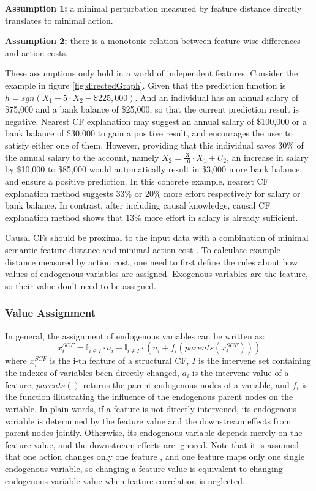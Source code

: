 \noindent \textbf{Assumption 1:} a minimal perturbation measured by feature distance directly translates to minimal action.

\noindent \textbf{Assumption 2:} there is a monotonic relation between feature-wise differences and action costs.

These assumptions only hold in a world of independent features. Consider the example in figure \ref{fig:directedGraph}. Given that the prediction function is $h=sgn(X_1+5\cdot X_2-\$225,000)$. And an individual has an annual salary of \$75,000 and a bank balance of \$25,000, so that the current prediction result is negative. Nearest CF explanation may suggest an annual salary of \$100,000 or a bank balance of \$30,000 to gain a positive result, and encourages the user to satisfy either one of them. However, providing that this individual saves 30\% of the annual salary to the account, namely $X_2=\frac{3}{10}\cdot X_1+U_2$, an increase in salary by \$10,000 to \$85,000 would automatically result in \$3,000 more bank balance, and ensure a positive prediction. In this concrete example, nearest CF explanation method suggests 33\% or 20\% more effort respectively for salary or bank balance. In contrast, after including causal knowledge, causal CF explanation method shows that 13\% more effort in salary is already sufficient.  

Causal CFs should be proximal to the input data with a combination of minimal semantic feature distance and minimal action cost \cite{algorithmicrecourse,preservingCausal}. To calculate example distance measured by action cost, one need to first define the rules about how values of endogenous variables are assigned. Exogenous variables are the feature, so their value don't need to be assigned.
\subsubsection{Value Assignment} In general, the assignment of endogenous variables can be written as:
\begin{equation}\label{eq:SCM}
  x_i^{SCF}=\mathbb{I}_{i\in I}\cdot a_i+\mathbb{I}_{i\notin I}\cdot(u_i+f_i(parents(x_i^{SCF})))
\end{equation}
where $x_i^{SCF}$ is the i-th feature of a structural CF, $I$ is the intervene set containing the indexes of variables been directly changed, $a_i$ is the intervene value of a feature, $parents()$ returns the parent endogenous nodes of a variable, and $f_i$ is the function illustrating the influence of the endogenous parent nodes on the variable. In plain words, if a feature is not directly intervened, its endogenous variable is determined by the feature value and the downstream effects from parent nodes jointly. Otherwise, its endogenous variable depends merely on the feature value, and the downstream effects are ignored. Note that it is assumed that one action changes only one feature \cite{algorithmicrecourse}, and one feature maps only one single endogenous variable, so changing a feature value is equivalent to changing endogenous variable value when feature correlation is neglected.

